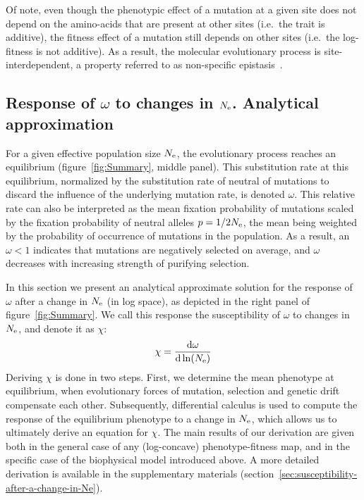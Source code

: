 Of note, even though the phenotypic effect of a mutation at a given site does not depend on the amino-acids that are present at other sites (i.e.~the trait is additive), the fitness effect of a mutation still depends on other sites (i.e.~the log-fitness is not additive).
As a result, the molecular evolutionary process is site-interdependent, a property referred to as non-specific epistasis~\citep{Starr2016,Dasmeh2018}.

\subsection{Response of \texorpdfstring{$\omega$}{ω} to changes in \texorpdfstring{$N_{\text{e}}$}{Nₑ}. Analytical approximation}

For a given \gls{effective population size} $N_{\text{e}}$, the evolutionary process reaches an equilibrium (figure~\ref{fig:Summary}, middle panel).
This \gls{substitution} rate at this equilibrium, normalized by the \gls{substitution} rate of \gls{neutral} of mutations to discard the influence of the underlying mutation rate, is denoted $\omega$.
This relative rate can also be interpreted as the mean fixation probability of mutations scaled by the fixation probability of \gls{neutral} \glspl{allele} $p = 1 / {2 N_{\text{e}}}$, the mean being weighted by the probability of occurrence of mutations in the population.
As a result, an $\omega < 1$ indicates that mutations are negatively selected on average, and $\omega$ decreases with increasing strength of purifying selection.

In this section we present an analytical approximate solution for the response of $\omega$ after a change in $N_{\text{e}}$ (in log space), as depicted in the right panel of figure~\ref{fig:Summary}.
We call this response the susceptibility of $\omega$ to changes in $N_{\text{e}}$, and denote it as $\chi$:
\begin{align}
    \chi = \frac{ \der \omega}{\der \ln (\Ne)} \label{eq:chi}
\end{align}
Deriving $\chi$ is done in two steps.
First, we determine the mean \gls{phenotype} at equilibrium, when evolutionary forces of mutation, selection and \gls{genetic drift} compensate each other.
Subsequently, differential calculus is used to compute the response of the equilibrium \gls{phenotype} to a change in $N_{\text{e}}$, which allows us to ultimately derive an equation for $\chi$.
The main results of our derivation are given both in the general case of any (log-concave) phenotype-fitness map, and in the specific case of the biophysical model introduced above.
A more detailed derivation is available in the supplementary materials (section~\ref{sec:susceptibility-after-a-change-in-Ne}).


